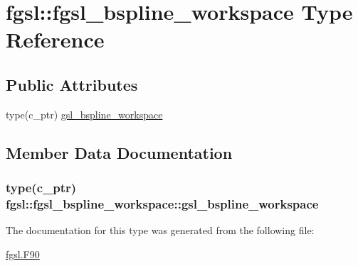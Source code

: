 \hypertarget{structfgsl_1_1fgsl__bspline__workspace}{\section{fgsl\-:\-:fgsl\-\_\-bspline\-\_\-workspace Type Reference}
\label{structfgsl_1_1fgsl__bspline__workspace}
}
\subsection*{Public Attributes}
\begin{DoxyCompactItemize}
\item 
type(c\-\_\-ptr) \hyperlink{structfgsl_1_1fgsl__bspline__workspace_a4f8d27353e3f5e3aabbcfe07c0b932da}{gsl\-\_\-bspline\-\_\-workspace}
\end{DoxyCompactItemize}


\subsection{Member Data Documentation}
\hypertarget{structfgsl_1_1fgsl__bspline__workspace_a4f8d27353e3f5e3aabbcfe07c0b932da}{
\subsubsection[{gsl\-\_\-bspline\-\_\-workspace}]{\setlength{\rightskip}{0pt plus 5cm}type(c\-\_\-ptr) fgsl\-::fgsl\-\_\-bspline\-\_\-workspace\-::gsl\-\_\-bspline\-\_\-workspace}}\label{structfgsl_1_1fgsl__bspline__workspace_a4f8d27353e3f5e3aabbcfe07c0b932da}


The documentation for this type was generated from the following file\-:\begin{DoxyCompactItemize}
\item 
\hyperlink{fgsl_8F90}{fgsl.\-F90}\end{DoxyCompactItemize}
